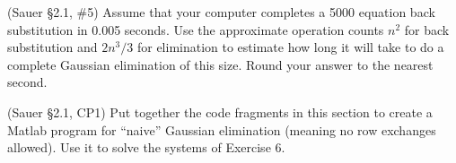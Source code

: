 \documentclass[12pt,fleqn]{exam}
\begin{document}
\begin{questions}

\question (Sauer \S2.1, \#5) Assume that your computer completes a 5000 equation back substitution in 0.005 seconds. Use the approximate operation counts $n^2$ for back substitution and $2n^3/3$ for elimination to estimate how long it will take to do a complete Gaussian elimination of this size. Round your answer to the nearest second.

\question (Sauer \S2.1, CP1) Put together the code fragments in this section to create a Matlab program for ``naive'' Gaussian elimination (meaning no row exchanges allowed). Use it to solve the systems of Exercise 6.

\end{questions}
\end{document}
